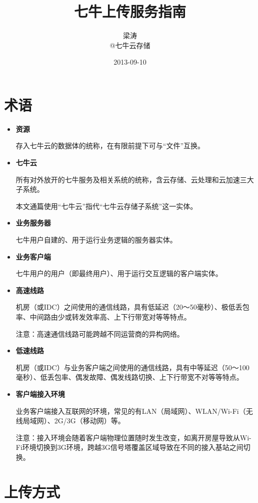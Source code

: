 \documentclass[11pt, oneside]{book}
\title{七牛上传服务指南}
\author{梁涛 \\ @七牛云存储}
\date{2013-09-10}
\newcommand{\qhint}[1]{
\footnotesize
\vspace{0.2em}
\noindent
#1\par
\vspace{-0.5em}
\normalsize
}
\begin{document}
\maketitle
\tableofcontents

\chapter{术语}


\begin{itemize}
\item {\bf 资源}\par
\qhint{存入七牛云的数据体的统称，在有限前提下可与“文件”互换。}

\item {\bf 七牛云}\par
\qhint{所有对外放开的七牛服务及相关系统的统称，含云存储、云处理和云加速三大子系统。}
\qhint{本文通篇使用“七牛云”指代“七牛云存储子系统”这一实体。}

\item {\bf 业务服务器}\par
\qhint{七牛用户自建的、用于运行业务逻辑的服务器实体。}

\item {\bf 业务客户端}\par
\qhint{七牛用户的用户（即最终用户）、用于运行交互逻辑的客户端实体。}

\item {\bf 高速线路}\par
\qhint{机房（或IDC）之间使用的通信线路，具有低延迟（20～50毫秒）、极低丢包率、中间路由少或转发效率高、上下行带宽对等等特点。}
\qhint{注意：高速通信线路可能跨越不同运营商的异构网络。}

\item {\bf 低速线路}\par
\qhint{机房（或IDC）与业务客户端之间使用的通信线路，具有中等延迟（50～100毫秒）、低丢包率、偶发故障、偶发线路切换、上下行带宽不对等等特点。}

\item {\bf 客户端接入环境}\par
\qhint{业务客户端接入互联网的环境，常见的有LAN（局域网）、WLAN/Wi-Fi（无线局域网）、2G/3G（移动网）等。}
\qhint{注意：接入环境会随着客户端物理位置随时发生改变，如离开房屋导致从Wi-Fi环境切换到3G环境，跨越3G信号塔覆盖区域导致在不同的接入基站之间切换。}
\end{itemize}

\chapter{上传方式}
\end{document}
